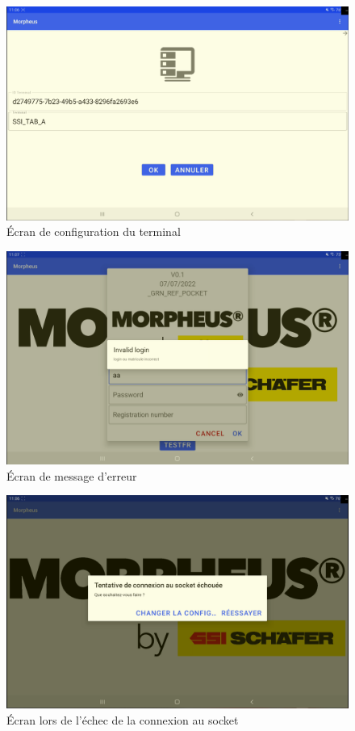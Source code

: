 \documentclass[a4paper, 12pt, french]{article}
\begin{document}
			\begin{figure}[h!]
				\begin{center}
					\includegraphics[width=0.7\linewidth]{application/config_terminal.PNG}
				\end{center}
				\caption{Écran de configuration du terminal}
				\label{fig:applications:config_terminal}
			\end{figure}	

		\newpage

			\begin{figure}[h!]
				\begin{center}
					\includegraphics[width=0.7\linewidth]{application/error_message.PNG}
				\end{center}
				\caption{Écran de message d'erreur}
				\label{fig:applications:error_message}
			\end{figure}	

			\vfill

			\begin{figure}[h!]
				\begin{center}
					\includegraphics[width=0.7\linewidth]{application/fail.PNG}
				\end{center}
				\caption{Écran lors de l'échec de la connexion au socket}
				\label{fig:applications:fail}
			\end{figure}	
\end{document}
